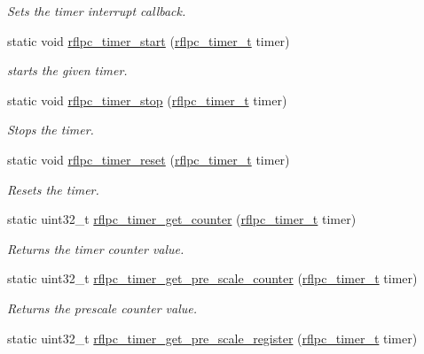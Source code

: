 \begin{DoxyCompactItemize}
\begin{DoxyCompactList}\small\item\em Sets the timer interrupt callback. \end{DoxyCompactList}\item 
static void \hyperlink{group__timer_gaba3c362b2682760af6b95bc5726ed8f9}{rflpc\-\_\-timer\-\_\-start} (\hyperlink{group__timer_gac08825cb88d61086e74638b859cb8b34}{rflpc\-\_\-timer\-\_\-t} timer)
\begin{DoxyCompactList}\small\item\em starts the given timer. \end{DoxyCompactList}\item 
static void \hyperlink{group__timer_ga59f99025452f71c40ad366292a11f6c8}{rflpc\-\_\-timer\-\_\-stop} (\hyperlink{group__timer_gac08825cb88d61086e74638b859cb8b34}{rflpc\-\_\-timer\-\_\-t} timer)
\begin{DoxyCompactList}\small\item\em Stops the timer. \end{DoxyCompactList}\item 
static void \hyperlink{group__timer_ga4fadb2ed73522d4d76c984e62ddbc2c1}{rflpc\-\_\-timer\-\_\-reset} (\hyperlink{group__timer_gac08825cb88d61086e74638b859cb8b34}{rflpc\-\_\-timer\-\_\-t} timer)
\begin{DoxyCompactList}\small\item\em Resets the timer. \end{DoxyCompactList}\item 
static uint32\-\_\-t \hyperlink{group__timer_ga57e24ccdcea66db465b16834b44b59a9}{rflpc\-\_\-timer\-\_\-get\-\_\-counter} (\hyperlink{group__timer_gac08825cb88d61086e74638b859cb8b34}{rflpc\-\_\-timer\-\_\-t} timer)
\begin{DoxyCompactList}\small\item\em Returns the timer counter value. \end{DoxyCompactList}\item 
static uint32\-\_\-t \hyperlink{group__timer_gaed7ce6332d04ec5a155f69c88af66709}{rflpc\-\_\-timer\-\_\-get\-\_\-pre\-\_\-scale\-\_\-counter} (\hyperlink{group__timer_gac08825cb88d61086e74638b859cb8b34}{rflpc\-\_\-timer\-\_\-t} timer)
\begin{DoxyCompactList}\small\item\em Returns the prescale counter value. \end{DoxyCompactList}\item 
static uint32\-\_\-t \hyperlink{group__timer_gaa84d035967961290a81fdc03ec6cf2f5}{rflpc\-\_\-timer\-\_\-get\-\_\-pre\-\_\-scale\-\_\-register} (\hyperlink{group__timer_gac08825cb88d61086e74638b859cb8b34}{rflpc\-\_\-timer\-\_\-t} timer)

\end{DoxyCompactItemize}
